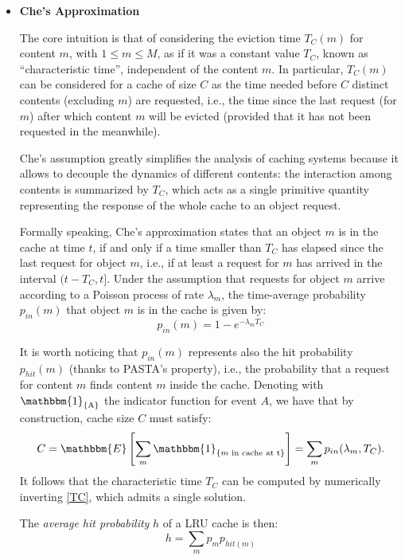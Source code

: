 \documentclass[10pt]{article}
\begin{document}
\begin{itemize}
  \item \textbf{Che's Approximation \cite{wang02jsac_hierarchical}}

  The core intuition is that of considering the eviction time $T_C(m)$ for content $m$, with $1 \le m \le M$, as if it was a constant value $T_C$, known as ``characteristic time'', independent of the content $m$. In particular, $T_C(m)$ can be considered for a cache of size $C$ as the time needed before $C$ distinct contents (excluding $m$) are requested, i.e., the time since the last request (for $m$) after which content $m$ will be evicted (provided that it has not been requested in the meanwhile).  

  Che's assumption greatly simplifies the analysis of caching systems because it allows to decouple the dynamics of different contents: the interaction among contents is summarized by $T_C$, which acts as a single primitive quantity representing the response of the whole cache to an object request.

  Formally speaking, Che's approximation states that an object $m$ is in the cache at time $t$, if and only if a time smaller than $T_C$ has elapsed since the last request for object $m$, i.e., if at least a request for $m$ has arrived in the interval $(t - T_C, t]$. Under the assumption that requests for object $m$ arrive according to a Poisson process of rate $\lambda_m$, the time-average probability $p_{in}(m)$ that object $m$ is in the cache is given by:
  \begin{equation}\label{pin}
  p_{in}(m) = 1 - e^{-\lambda_m T_C}
  \end{equation}

  It is worth noticing that $p_{in}(m)$ represents also the hit probability $p_{hit}(m)$ (thanks to PASTA's property), i.e., the probability that a request for content $m$ finds content $m$ inside the cache. 
  Denoting  with $\mathbbm{1}_{\text{\{A\}}}$ the indicator function for event $A$, we have that by construction, cache size $C$ must satisfy:%
  \begin{equation}\label{TC}
  C=\mathbbm{E}\left[ \sum_m \mathbbm{1}_{\{\text{$m$ in cache at t}\}}\right]= \sum\limits_{m} p_{in}(\lambda_m,T_C).
  \end{equation} 
%
%
It follows that the characteristic time $T_C$ can be computed by numerically inverting \eqref{TC}, which admits a single solution\cite{wang02jsac_hierarchical}.

The \emph{average hit probability} $h$ of a LRU cache is then:
\begin{equation}
h = \sum_m p_m p_{hit(m)}
\end{equation}
\end{itemize} 
\end{document}
